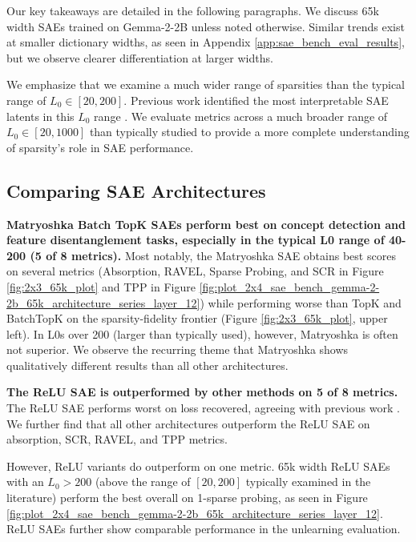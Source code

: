 \documentclass{article}
\theoremstyle{plain}
\theoremstyle{definition}
\theoremstyle{remark}
\begin{document}
Our key takeaways are detailed in the following paragraphs. We discuss 65k width SAEs trained on Gemma-2-2B unless noted otherwise. Similar trends exist at smaller dictionary widths, as seen in Appendix \ref{app:sae_bench_eval_results}, but we observe clearer differentiation at larger widths.

We emphasize that we examine a much wider range of sparsities than the typical range of $L_0 \in [20, 200]$. Previous work identified the most interpretable SAE latents in this $L_0$ range \cite{bricken2023monosemanticity, rajamanoharan2024jumping}. We evaluate metrics across a much broader range of $L_0 \in [20, 1000]$ than typically studied to provide a more complete understanding of sparsity's role in SAE performance.%


\subsection{Comparing SAE Architectures}

\textbf{Matryoshka Batch TopK SAEs perform best on concept detection and feature disentanglement tasks, especially in the typical L0 range of 40-200 (5 of 8 metrics).} Most notably, the Matryoshka SAE obtains best scores on several metrics (Absorption, RAVEL, Sparse Probing, and SCR in Figure \ref{fig:2x3_65k_plot} and TPP in Figure \ref{fig:plot_2x4_sae_bench_gemma-2-2b_65k_architecture_series_layer_12}) while performing worse than TopK and BatchTopK on the sparsity-fidelity frontier (Figure \ref{fig:2x3_65k_plot}, upper left). In L0s over 200 (larger than typically used), however, Matryoshka is often not superior. We observe the recurring theme that Matryoshka shows qualitatively different results than all other architectures.

\textbf{The ReLU SAE is outperformed by other methods on 5 of 8 metrics.}
The ReLU SAE performs worst on loss recovered, agreeing with previous work \cite{circuits2024august, rajamanoharan2024improving, gao2024scaling}. We further find that all other architectures outperform the ReLU SAE on absorption, SCR, RAVEL, and TPP metrics.

However, ReLU variants do outperform on one metric. 65k width ReLU SAEs with an $L_0 > 200$ (above the range of $[20, 200]$ typically examined in the literature) perform the best overall on 1-sparse probing, as seen in Figure \ref{fig:plot_2x4_sae_bench_gemma-2-2b_65k_architecture_series_layer_12}. ReLU SAEs further show comparable performance in the unlearning evaluation.
\end{document}
